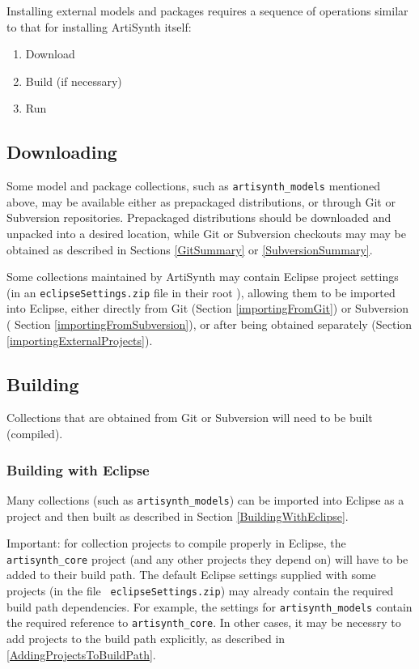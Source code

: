 Installing external models and packages requires a sequence of
operations similar to that for installing ArtiSynth itself:

\begin{enumerate}

\item Download

\item Build (if necessary)

\item Run

\end{enumerate}

\subsection{Downloading}

Some model and package collections, such as {\tt artisynth\_models}
mentioned above, may be available either as prepackaged distributions,
or through Git or Subversion repositories.  Prepackaged distributions
should be downloaded and unpacked into a desired location, while Git
or Subversion checkouts may may be obtained as described in
Sections \ref{GitSummary} or \ref{SubversionSummary}.

Some collections maintained by ArtiSynth may contain Eclipse project
settings (in an {\tt eclipseSettings.zip} file in their root
\directory{}), allowing them to be imported into Eclipse, either
directly from Git (Section \ref{importingFromGit}) or Subversion (
Section \ref{importingFromSubversion}),
or after being obtained separately 
(Section \ref{importingExternalProjects}).

\subsection{Building}

Collections that are obtained from Git or Subversion will need to be
built (compiled).

\subsubsection{Building with Eclipse}

Many collections (such as {\tt artisynth\_models}) can be imported
into Eclipse as a project and then built as described in Section
\ref{BuildingWithEclipse}.

\begin{sideblock}
Important: for collection projects to compile properly in Eclipse, the
{\tt artisynth\_core} project (and any other projects they depend on)
will have to be added to their build path. The default Eclipse
settings supplied with some projects (in the file {\tt
eclipseSettings.zip}) may already contain the required build path
dependencies. For example, the settings for {\tt artisynth\_models}
contain the required reference to {\tt artisynth\_core}.  In other
cases, it may be necessry to add projects to the build path
explicitly, as described in \ref{AddingProjectsToBuildPath}.
\end{sideblock}

